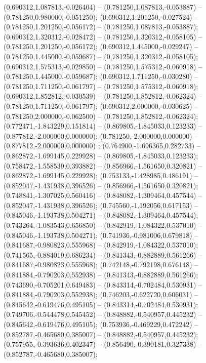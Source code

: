  (0.690312,1.087813,-0.026404) -- (0.781250,1.087813,-0.053887) -- (0.781250,0.980000,-0.051250);
 (0.690312,1.201250,-0.027524) -- (0.781250,1.201250,-0.056172) -- (0.781250,1.087813,-0.053887);
 (0.690312,1.320312,-0.028472) -- (0.781250,1.320312,-0.058105) -- (0.781250,1.201250,-0.056172);
 (0.690312,1.445000,-0.029247) -- (0.781250,1.445000,-0.059687) -- (0.781250,1.320312,-0.058105);
 (0.690312,1.575313,-0.029850) -- (0.781250,1.575312,-0.060918) -- (0.781250,1.445000,-0.059687);
 (0.690312,1.711250,-0.030280) -- (0.781250,1.711250,-0.061797) -- (0.781250,1.575312,-0.060918);
 (0.690312,1.852812,-0.030539) -- (0.781250,1.852812,-0.062324) -- (0.781250,1.711250,-0.061797);
 (0.690312,2.000000,-0.030625) -- (0.781250,2.000000,-0.062500) -- (0.781250,1.852812,-0.062324);
 (0.772471,-1.843229,0.151814) -- (0.869805,-1.845033,0.123233) -- (0.877812,-2.000000,0.000000);
 (0.781250,-2.000000,0.000000) -- (0.877812,-2.000000,0.000000) ;
 (0.764900,-1.696365,0.282733) -- (0.862872,-1.699145,0.229928) -- (0.869805,-1.845033,0.123233);
 (0.758472,-1.558539,0.393882) -- (0.856966,-1.561650,0.320821) -- (0.862872,-1.699145,0.229928);
 (0.753133,-1.428985,0.486191) -- (0.852047,-1.431938,0.396526) -- (0.856966,-1.561650,0.320821);
 (0.748841,-1.307025,0.560416) -- (0.848082,-1.309464,0.457544) -- (0.852047,-1.431938,0.396526);
 (0.745560,-1.192056,0.617153) -- (0.845046,-1.193738,0.504271) -- (0.848082,-1.309464,0.457544);
 (0.743264,-1.083543,0.656850) -- (0.842919,-1.084322,0.537010) -- (0.845046,-1.193738,0.504271);
 (0.741936,-0.981006,0.679818) -- (0.841687,-0.980823,0.555968) -- (0.842919,-1.084322,0.537010);
 (0.741565,-0.884019,0.686234) -- (0.841343,-0.882889,0.561266) -- (0.841687,-0.980823,0.555968);
 (0.742148,-0.792198,0.676148) -- (0.841884,-0.790203,0.552938) -- (0.841343,-0.882889,0.561266);
 (0.743690,-0.705201,0.649483) -- (0.843314,-0.702484,0.530931) -- (0.841884,-0.790203,0.552938);
 (0.746203,-0.622720,0.606031) -- (0.845642,-0.619476,0.495105) -- (0.843314,-0.702484,0.530931);
 (0.749706,-0.544478,0.545452) -- (0.848882,-0.540957,0.445232) -- (0.845642,-0.619476,0.495105);
 (0.753936,-0.469229,0.472242) -- (0.852787,-0.465680,0.385007) -- (0.848882,-0.540957,0.445232);
 (0.757955,-0.393636,0.402347) -- (0.856490,-0.390181,0.327338) -- (0.852787,-0.465680,0.385007);
